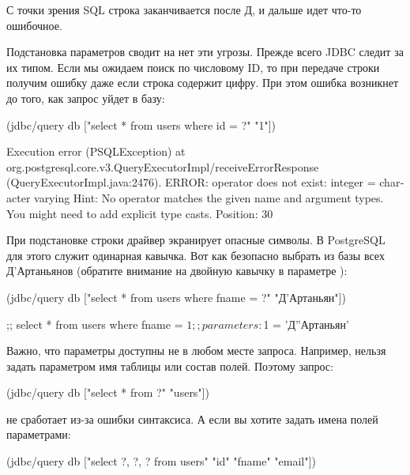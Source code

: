 С точки зрения SQL строка заканчивается после Д, и дальше идет что-то ошибочное.

Подстановка параметров сводит на нет эти угрозы. Прежде всего JDBC следит за их типом. Если мы ожидаем поиск по числовому ID, то при передаче строки получим ошибку даже если строка содержит цифру. При этом ошибка возникнет до того, как запрос уйдет в базу:

\begin{english}
  \begin{clojure}
(jdbc/query db ["select * from users where id = ?" "1"])


Execution error (PSQLException) at org.postgresql.core.v3.QueryExecutorImpl/receiveErrorResponse (QueryExecutorImpl.java:2476).
ERROR: operator does not exist: integer = character varying
  Hint: No operator matches the given name and argument types. You might need to add explicit type casts.
  Position: 30
  \end{clojure}
\end{english}

При подстановке строки драйвер экранирует опасные символы. В PostgreSQL для этого служит одинарная кавычка. Вот как безопасно выбрать из базы всех Д'Артаньянов (обратите внимание на двойную кавычку в параметре ):

  \begin{clojure}
(jdbc/query db ["select * from users where fname = ?" "Д'Артаньян"])

;; select * from users where fname = $1
;; parameters: $1 = 'Д''Артаньян'
  \end{clojure}

Важно, что параметры доступны не в любом месте запроса. Например, нельзя задать параметром имя таблицы или состав полей. Поэтому запрос:

\begin{english}
  \begin{clojure}
(jdbc/query db ["select * from ?" "users"])
  \end{clojure}
\end{english}

не сработает из-за ошибки синтаксиса. А если вы хотите задать имена полей параметрами:

\begin{english}
  \begin{clojure}
(jdbc/query db ["select ?, ?, ? from users" "id" "fname" "email"])
  \end{clojure}
\end{english}

